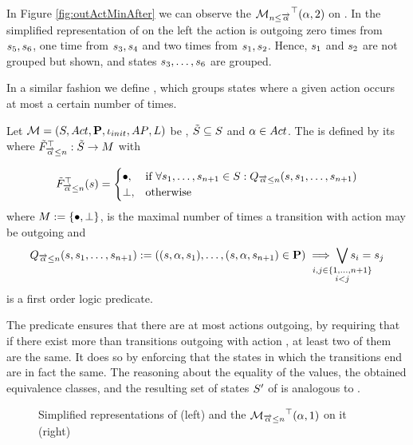 \documentclass[preview]{standalone}
\begin{document}
\begin{exmp}
	In Figure \ref{fig:outActMinAfter} we can observe the \viewN ${{{{{\mathcal{M}}}}_{{{n}\leq{\overrightarrow{\ensuremath{{\alpha}}}}}}}^{\top}}({\alpha},2)$ on \chgph. In the simplified representation of \achgphN on the left the action \action is outgoing zero times from ${s}_5, {s}_6$, one time from ${s}_3, {s}_4$ and two times from ${s}_1, {s}_2$. Hence, ${s}_1$ and ${s}_2$ are not grouped but shown, and states ${s}_3, \dots, {s}_6$ are grouped.
\end{exmp}

\noindent In a similar fashion we define \viewN, which groups states where a given action occurs at most a certain number of times. 

\begin{definition}
	Let ${{{\mathcal{M}}}} = {{({S}, {Act}, {\textbf{P}}, {\iota_{init}}, {AP}, {L})}}$ be \achgphN, ${\tilde{{S}}} \subseteq {S}$ and ${\alpha} \in {Act}$. The \viewN \viewmaxoutaction is defined by its \grpfctN \gfctmaxoutaction where ${{\tilde{F}_{{{\overrightarrow{{\alpha}}}\leq{n}}}}^{\top}} : {\tilde{{S}}} \to {\ensuremath{{M}}}$ with

	\[
	{{\tilde{F}_{{{\overrightarrow{{\alpha}}}\leq{n}}}}^{\top}}({s}) =
	\begin{cases}
			{\bullet},				& \text{if } \forall {s}_1, \dots, {s}_{{n}+1} \in {S}: {Q_{{\overrightarrow{{\alpha}}}\leq{n}}({s},{s}_1, \dots, {s}_{{n}+1})} \\
			{\bot},     	& \text{otherwise}
		\end{cases}
	\]
	where ${{M}} := {\{{\bullet}, {\bot}\}}$,
	is the maximal number of times a transition with action \action may be outgoing and 
	\[
	\predmaxoutact := ((\state, \action, \state_1), \dots, (\state, \action, \state_{\numoutact+1}) \in \trans) \implies \bigvee_{\mathclap{\substack{i,j \in \{1,\dots, \numoutact+1\} \\ i < j}}} \state_i = \state_j
	\]
	is a first order logic predicate.
	\label{def:viewmaxoutaction}
\end{definition}

The predicate \predmaxoutact ensures that there are at most \numoutact actions \action outgoing, by requiring that if there exist more than \numoutact transitions outgoing with action \action, at least two of them are the same. It does so by enforcing that the states in which the transitions end are in fact the same. The reasoning about the equality of the \grpfctN values, the obtained equivalence classes, and the resulting set of states ${S}'$ of \viewN is analogous to \viewminoutaction.

\begin{figure}[!htb]
	\begin{minipage}{.5\textwidth}
		\hspace{5mm}
		
	\end{minipage}%
	\begin{minipage}{.5\textwidth}
		\hspace{5mm}
		
	\end{minipage}
	\caption{Simplified representations of \mdp (left) and the \viewN ${{{{{\mathcal{M}}}}_{{{\overrightarrow{{\alpha}}}\leq{n}}}}^{\top}}({\alpha},1)$ on it (right)}
	\label{fig:outActMaxAfter} 
\end{figure}
\end{document}
